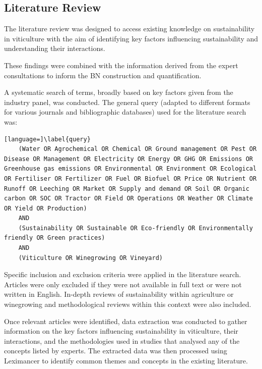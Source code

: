 \subsection{Literature Review}

The literature review was designed to access existing knowledge on sustainability in viticulture with the aim of identifying key factors influencing sustainability and understanding their interactions.

These findings were combined with the information derived from the expert consultations to inform the BN construction and quantification. 

A systematic search of terms, broadly based on key factors given from the industry panel, was conducted. The general query (adapted to different formats for various journals and bibliographic databases) used for the literature search was: 

\begin{lstlisting}[language=]\label{query}
    (Water OR Agrochemical OR Chemical OR Ground management OR Pest OR Disease OR Management OR Electricity OR Energy OR GHG OR Emissions OR Greenhouse gas emissions OR Environmental OR Environment OR Ecological OR Fertiliser OR Fertilizer OR Fuel OR Biofuel OR Price OR Nutrient OR Runoff OR Leeching OR Market OR Supply and demand OR Soil OR Organic carbon OR SOC OR Tractor OR Field OR Operations OR Weather OR Climate OR Yield OR Production)
    AND
    (Sustainability OR Sustainable OR Eco-friendly OR Environmentally friendly OR Green practices)
    AND
    (Viticulture OR Winegrowing OR Vineyard)
    \end{lstlisting}

Specific inclusion and exclusion criteria were applied in the literature search. Articles were only excluded if they were not available in full text or were not written in English. In-depth reviews of sustainability within agriculture or winegrowing and methodological reviews within this context were also included.

Once relevant articles were identified, data extraction was conducted to gather information on the key factors influencing sustainability in viticulture, their interactions, and the methodologies used in studies that analysed any of the concepts listed by experts. The extracted data was then processed using Leximancer to identify common themes and concepts in the existing literature.


